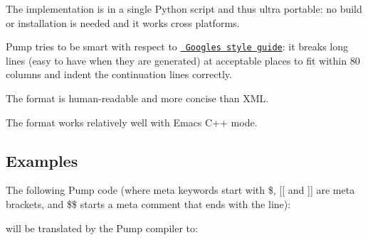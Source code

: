 \begin{DoxyItemize}
\item The implementation is in a single Python script and thus ultra portable\+: no build or installation is needed and it works cross platforms.
\item Pump tries to be smart with respect to \href{http://code.google.com/p/google-styleguide/}\texttt{ Google\textquotesingle{}s style guide}\+: it breaks long lines (easy to have when they are generated) at acceptable places to fit within 80 columns and indent the continuation lines correctly.
\item The format is human-\/readable and more concise than X\+ML.
\item The format works relatively well with Emacs\textquotesingle{} C++ mode.
\end{DoxyItemize}

\subsection*{Examples}

The following Pump code (where meta keywords start with {\ttfamily \$}, {\ttfamily \mbox{[}\mbox{[}} and {\ttfamily \mbox{]}\mbox{]}} are meta brackets, and {\ttfamily \$\$} starts a meta comment that ends with the line)\+:


\begin{DoxyCode}{0}
\DoxyCodeLine{\$for i [[}
\DoxyCodeLine{\$if i == 0 [[}
\DoxyCodeLine{]] \$elif i <= 2 [[}
\DoxyCodeLine{]] \$else [[}
\DoxyCodeLine{]]}
\DoxyCodeLine{\};}
\DoxyCodeLine{}
\DoxyCodeLine{]]}
\end{DoxyCode}


will be translated by the Pump compiler to\+:


\begin{DoxyCode}{0}
\DoxyCodeLine{\};}
\DoxyCodeLine{}
\DoxyCodeLine{\};}
\DoxyCodeLine{}
\DoxyCodeLine{\};}
\DoxyCodeLine{}
\DoxyCodeLine{\};}
\end{DoxyCode}


